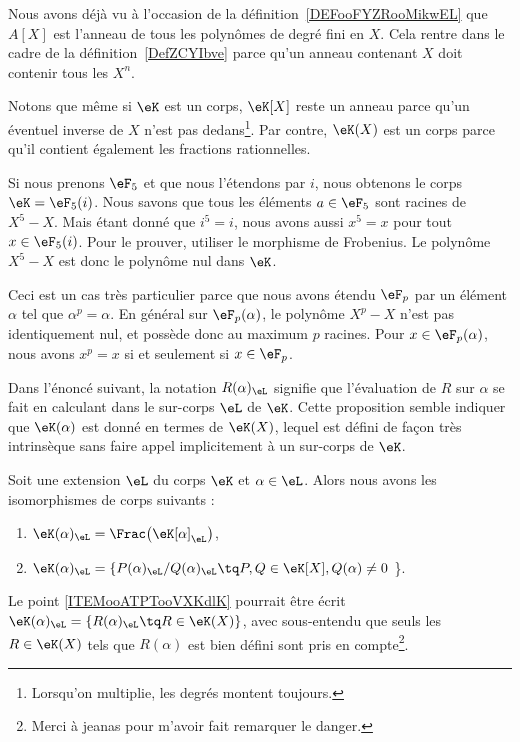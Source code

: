 \begin{example}
	Nous avons déjà vu à l'occasion de la définition~\ref{DEFooFYZRooMikwEL} que \( A[X]\) est l'anneau de tous les polynômes de degré fini en \( X\). Cela rentre dans le cadre de la définition~\ref{DefZCYIbve} parce qu'un anneau contenant \( X\) doit contenir tous les \( X^n\).

	Notons que même si \( \eK\) est un corps, \( \eK[X]\) reste un anneau parce qu'un éventuel inverse de \( X\) n'est pas dedans\footnote{Lorsqu'on multiplie, les degrés montent toujours.}. Par contre, \( \eK(X)\) est un corps parce qu'il contient également les fractions rationnelles.
\end{example}

\begin{example} \label{ExLQhLhJ}
	Si nous prenons \( \eF_5\) et que nous l'étendons par \( i\), nous obtenons le corps \( \eK=\eF_5(i)\). Nous savons que tous les éléments \( a\in \eF_5\) sont racines de \( X^5-X\). Mais étant donné que \( i^5=i\), nous avons aussi \( x^5=x\) pour tout \( x\in \eF_5(i)\). Pour le prouver, utiliser le morphisme de Frobenius. Le polynôme \( X^5-X\) est donc le polynôme nul dans \( \eK\).

	Ceci est un cas très particulier parce que nous avons étendu \( \eF_p\) par un élément \( \alpha\) tel que \( \alpha^p=\alpha\). En général sur \( \eF_p(\alpha)\), le polynôme \( X^p-X\) n'est pas identiquement nul, et possède donc au maximum \( p\) racines. Pour \( x\in \eF_p(\alpha)\), nous avons \( x^p=x\) si et seulement si \( x\in \eF_p\).
\end{example}

Dans l'énoncé suivant, la notation \( R(\alpha)_{\eL}\) signifie que l'évaluation de \( R\) sur \( \alpha\) se fait en calculant dans le sur-corps \( \eL\) de \( \eK\).  Cette proposition semble indiquer que \( \eK(\alpha)\) est donné en termes de \( \eK(X)\), lequel est défini de façon très intrinsèque sans faire appel implicitement à un sur-corps de \( \eK\).

\begin{proposition}     \label{PROPooYSFNooFGbbCi}
	Soit une extension \( \eL\) du corps \( \eK\) et \( \alpha\in \eL\). Alors nous avons les isomorphismes de corps suivants :
	\begin{enumerate}
		\item
		      \( \eK(\alpha)_{\eL}=\Frac\big( \eK[\alpha]_{\eL} \big)\),
		\item       \label{ITEMooATPTooVXKdlK}
		      \( \eK(\alpha)_{\eL}=\{ P(\alpha)_{\eL}/Q(\alpha)_{\eL} \tq P,Q\in \eK[X], Q(\alpha)\neq 0\) \}.
	\end{enumerate}
	Le point \ref{ITEMooATPTooVXKdlK} pourrait être écrit \( \eK(\alpha)_{\eL}=\{ R(\alpha)_{\eL}\tq R\in \eK(X) \}\), avec sous-entendu que seuls les \( R\in \eK(X)\)  tels que \( R(\alpha)\) est bien défini sont pris en compte\footnote{Merci à jeanas pour m'avoir fait remarquer le danger\cite{BIBooPEDGooCQRqcV}.}.
\end{proposition}

